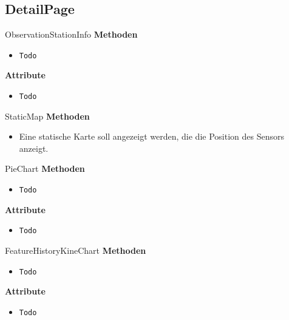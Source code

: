 \subsection{DetailPage}

   
    \begin{Class}{ObservationStationInfo}
        \textbf{Methoden}
        \begin{itemize}
            \item \texttt{Todo}
        \end{itemize}
        
        \textbf{Attribute}
        \begin{itemize}
            \item \texttt{Todo}
        \end{itemize}
    \end{Class}

    \begin{Class}{StaticMap}
        \textbf{Methoden}
        \begin{itemize}
            \item Eine statische Karte soll angezeigt werden, die die Position des Sensors anzeigt.
        \end{itemize}
    \end{Class}

  

    \begin{Class}{PieChart}
        \textbf{Methoden}
        \begin{itemize}
            \item \texttt{Todo}
        \end{itemize}
        
        \textbf{Attribute}
        \begin{itemize}
            \item \texttt{Todo}
        \end{itemize}
    \end{Class}

    \begin{Class}{FeatureHistoryKineChart}
        \textbf{Methoden}
        \begin{itemize}
            \item \texttt{Todo}
        \end{itemize}
        
        \textbf{Attribute}
        \begin{itemize}
            \item \texttt{Todo}
        \end{itemize}
    \end{Class}

